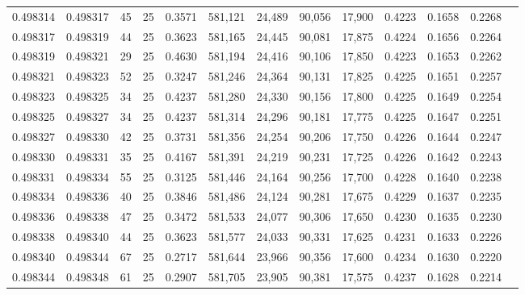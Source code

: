 \begin{tabular}{rrrrrrrrrrrrr}
0.498314 & 0.498317 &    45 &  25 &                                     0.3571 & 581,121 &  24,489 &  90,056 &  17,900 & 0.4223 & 0.1658 & 0.2268 \\
0.498317 & 0.498319 &    44 &  25 &                                     0.3623 & 581,165 &  24,445 &  90,081 &  17,875 & 0.4224 & 0.1656 & 0.2264 \\
0.498319 & 0.498321 &    29 &  25 &                                     0.4630 & 581,194 &  24,416 &  90,106 &  17,850 & 0.4223 & 0.1653 & 0.2262 \\
0.498321 & 0.498323 &    52 &  25 &                                     0.3247 & 581,246 &  24,364 &  90,131 &  17,825 & 0.4225 & 0.1651 & 0.2257 \\
0.498323 & 0.498325 &    34 &  25 &                                     0.4237 & 581,280 &  24,330 &  90,156 &  17,800 & 0.4225 & 0.1649 & 0.2254 \\
0.498325 & 0.498327 &    34 &  25 &                                     0.4237 & 581,314 &  24,296 &  90,181 &  17,775 & 0.4225 & 0.1647 & 0.2251 \\
0.498327 & 0.498330 &    42 &  25 &                                     0.3731 & 581,356 &  24,254 &  90,206 &  17,750 & 0.4226 & 0.1644 & 0.2247 \\
0.498330 & 0.498331 &    35 &  25 &                                     0.4167 & 581,391 &  24,219 &  90,231 &  17,725 & 0.4226 & 0.1642 & 0.2243 \\
0.498331 & 0.498334 &    55 &  25 &                                     0.3125 & 581,446 &  24,164 &  90,256 &  17,700 & 0.4228 & 0.1640 & 0.2238 \\
0.498334 & 0.498336 &    40 &  25 &                                     0.3846 & 581,486 &  24,124 &  90,281 &  17,675 & 0.4229 & 0.1637 & 0.2235 \\
0.498336 & 0.498338 &    47 &  25 &                                     0.3472 & 581,533 &  24,077 &  90,306 &  17,650 & 0.4230 & 0.1635 & 0.2230 \\
0.498338 & 0.498340 &    44 &  25 &                                     0.3623 & 581,577 &  24,033 &  90,331 &  17,625 & 0.4231 & 0.1633 & 0.2226 \\
0.498340 & 0.498344 &    67 &  25 &                                     0.2717 & 581,644 &  23,966 &  90,356 &  17,600 & 0.4234 & 0.1630 & 0.2220 \\
0.498344 & 0.498348 &    61 &  25 &                                     0.2907 & 581,705 &  23,905 &  90,381 &  17,575 & 0.4237 & 0.1628 & 0.2214 \\

\end{tabular}
